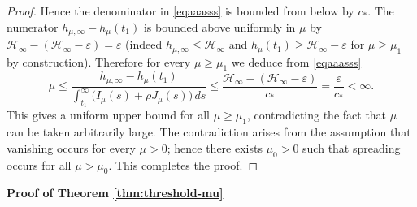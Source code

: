 \documentclass[a4paper,11pt]{amsart}
\theoremstyle{definition}
\numberwithin{equation}{section}
\theoremstyle{definition}
\begin{document}
\begin{proof}
Hence the denominator in \eqref{eqaaasss} is bounded from below by \(c_*\). The numerator \(h_{\mu,\infty}-h_{\mu}(t_1)\) is bounded above uniformly in \(\mu\) by \(\mathcal{H}_\infty - (\mathcal{H}_\infty-\varepsilon) = \varepsilon\) (indeed \(h_{\mu,\infty}\leq \mathcal{H}_\infty\) and \(h_{\mu}(t_1)\geq \mathcal{H}_\infty-\varepsilon\) for \(\mu\geq\mu_1\) by construction). Therefore for every \(\mu\geq\mu_1\) we deduce from \eqref{eqaaasss}
\[
\mu \leq \frac{h_{\mu,\infty}-h_{\mu}(t_1)}{\int_{t_1}^{\infty}\big(I_\mu(s)+\rho J_\mu(s)\big)\,ds}
\le \frac{\mathcal{H}_\infty - (\mathcal{H}_\infty-\varepsilon)}{c_*} = \frac{\varepsilon}{c_*} <\infty.
\]
This gives a uniform upper bound for all \(\mu\geq\mu_1\), contradicting the fact that \(\mu\) can be taken arbitrarily large. The contradiction arises from the assumption that vanishing occurs for every \(\mu>0\); hence there exists \(\mu_0>0\) such that spreading occurs for all \(\mu>\mu_0\). This completes the proof.
\end{proof}



\textbf{Proof of Theorem \ref{thm:threshold-mu}}
\end{document}
